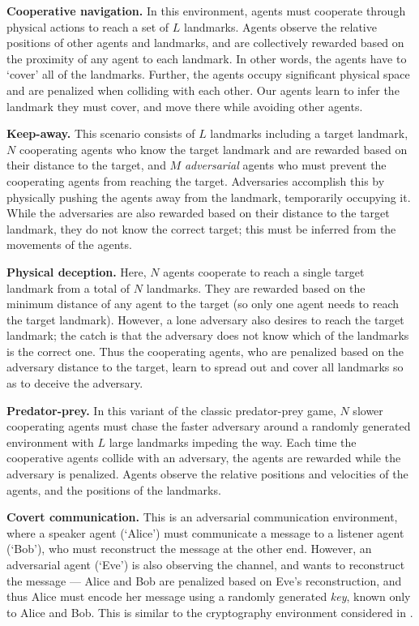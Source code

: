 \documentclass{article}
\begin{document}
\textbf{Cooperative navigation.} In this environment, agents must cooperate through physical actions to reach a set of $L$ landmarks. Agents observe the relative positions of other agents and landmarks, and are collectively rewarded based on the proximity of any agent to each landmark. In other words, the agents have to `cover' all of the landmarks. Further, the agents occupy significant physical space and are penalized when colliding with each other. Our agents learn to infer the landmark they must cover, and move there while avoiding other agents. 

\textbf{Keep-away.} This scenario consists of $L$ landmarks including a target landmark, $N$ cooperating agents who know the target landmark and are rewarded based on their distance to the target, and $M$ \textit{adversarial} agents who must prevent the cooperating agents from reaching the target.  Adversaries accomplish this by physically pushing the agents away from the landmark, temporarily occupying it. While the adversaries are also rewarded based on their distance to the target landmark, they do not know the correct target; this must be inferred from the movements of the agents. 

\textbf{Physical deception.} Here, $N$ agents cooperate to reach a single target landmark from a total of $N$ landmarks. They are rewarded based on the minimum distance of any agent to the target (so only one agent needs to reach the target landmark). However, a lone adversary also desires to reach the target landmark; the catch is that the adversary does not know which of the landmarks is the correct one. Thus the cooperating agents, who are penalized based on the adversary distance to the target, learn to spread out and cover all landmarks so as to deceive the adversary.

\textbf{Predator-prey.} In this variant of the classic predator-prey game, $N$ slower cooperating agents must chase the faster adversary around a randomly generated environment with $L$ large landmarks impeding the way. Each time the cooperative agents collide with an adversary, the agents are rewarded while the adversary is penalized. Agents observe the relative positions and velocities of the agents, and the positions of the landmarks.

\textbf{Covert communication.} This is an adversarial communication environment, where a speaker agent (`Alice') must communicate a message to a listener agent (`Bob'), who must reconstruct the message at the other end. However, an adversarial agent (`Eve') is also observing the channel, and wants to reconstruct the message --- Alice and Bob are penalized based on Eve's reconstruction, and thus Alice must encode her message using a randomly generated \textit{key}, known only to Alice and Bob. This is similar to the cryptography environment considered in \cite{abadi2016learning}.
\end{document}
